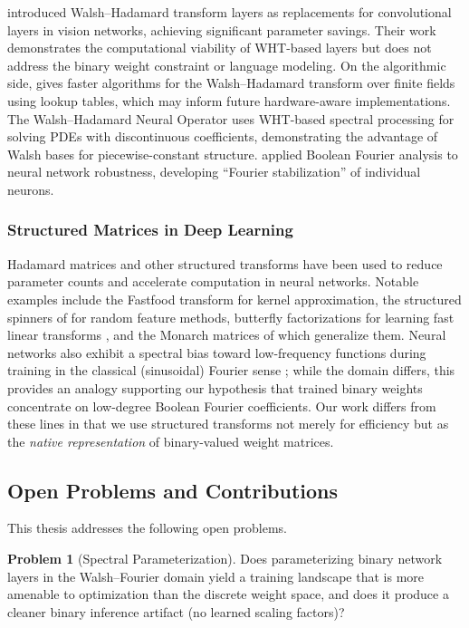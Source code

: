 \documentclass[12pt,a4paper]{article}
\theoremstyle{plain}
\theoremstyle{definition}
\newtheorem{problem}{Problem}
\theoremstyle{remark}
\begin{document}
\citet{pan2021fast, pan2022block} introduced Walsh--Hadamard transform layers as replacements for convolutional layers in vision networks, achieving significant parameter savings. Their work demonstrates the computational viability of WHT-based layers but does not address the binary weight constraint or language modeling. On the algorithmic side, \citet{alman2022faster} gives faster algorithms for the Walsh--Hadamard transform over finite fields using lookup tables, which may inform future hardware-aware implementations. The Walsh--Hadamard Neural Operator \citep{cavallazzi2025whno} uses WHT-based spectral processing for solving PDEs with discontinuous coefficients, demonstrating the advantage of Walsh bases for piecewise-constant structure. \citet{raviv2021enhancing} applied Boolean Fourier analysis to neural network robustness, developing ``Fourier stabilization'' of individual neurons.

\subsubsection{Structured Matrices in Deep Learning}

Hadamard matrices and other structured transforms have been used to reduce parameter counts and accelerate computation in neural networks. Notable examples include the Fastfood transform \citep{le2013fastfood} for kernel approximation, the structured spinners of \citet{choromanski2017unreasonable} for random feature methods, butterfly factorizations for learning fast linear transforms \citep{dao2019butterfly}, and the Monarch matrices of \citet{dao2022monarch} which generalize them. Neural networks also exhibit a spectral bias toward low-frequency functions during training in the classical (sinusoidal) Fourier sense \citep{rahaman2019spectral}; while the domain differs, this provides an analogy supporting our hypothesis that trained binary weights concentrate on low-degree Boolean Fourier coefficients. Our work differs from these lines in that we use structured transforms not merely for efficiency but as the \emph{native representation} of binary-valued weight matrices.


\subsection{Open Problems and Contributions}\label{sec:contributions}

This thesis addresses the following open problems.

\begin{problem}[Spectral Parameterization]\label{prob:spectral}
Does parameterizing binary network layers in the Walsh--Fourier domain yield a training landscape that is more amenable to optimization than the discrete weight space, and does it produce a cleaner binary inference artifact (no learned scaling factors)?
\end{problem}
\end{document}
